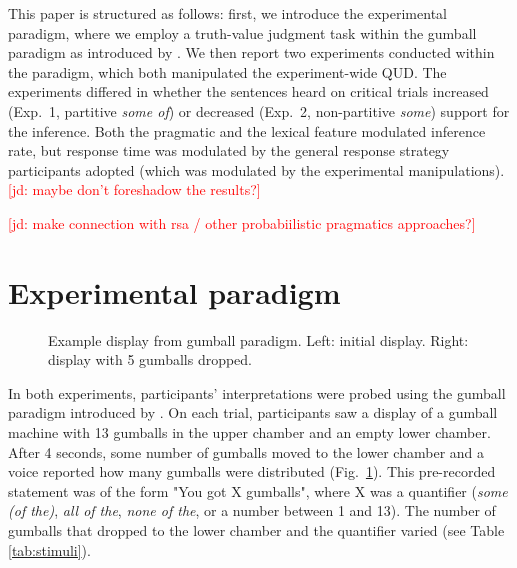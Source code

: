 \documentclass[10pt,letterpaper]{article}
\newcommand{\jd}[1]{\textcolor{Red}{[jd: #1]}}
\begin{document}
This paper is structured as follows: first, we introduce the experimental paradigm, where we employ a truth-value judgment task within the gumball paradigm as introduced by . We then report two experiments conducted within the paradigm, which both manipulated the experiment-wide QUD. The experiments differed in whether the sentences heard on critical trials increased (Exp.~1, partitive \emph{some of}) or decreased (Exp.~2, non-partitive \emph{some}) support for the inference. Both the pragmatic and the lexical feature modulated inference rate, but response time was modulated by the general response strategy participants adopted (which was modulated by the experimental manipulations).\jd{maybe don't foreshadow the results?}

\jd{make connection with rsa / other probabiilistic pragmatics approaches?}

\section{Experimental paradigm}

\begin{figure}
\caption{Example display from gumball paradigm. Left: initial display. Right: display with 5 gumballs dropped.  \label{fig:gumball-paradigm}}
\end{figure}

In both experiments, participants' interpretations were probed using the gumball paradigm introduced by .  On each trial, participants saw a display of a gumball machine with 13 gumballs in the upper chamber and an empty lower chamber. After 4 seconds, some number of gumballs moved to the lower chamber and a voice reported how many gumballs were distributed (Fig.~\ref{fig:gumball-paradigm}). This pre-recorded statement was of the form "You got X gumballs", where X was a quantifier (\textit{some (of the)},  \textit{all of the}, \textit{none of the}, or a number between 1 and 13). The number of gumballs that dropped to the lower chamber and the quantifier  varied (see Table \ref{tab:stimuli}).
\end{document}
